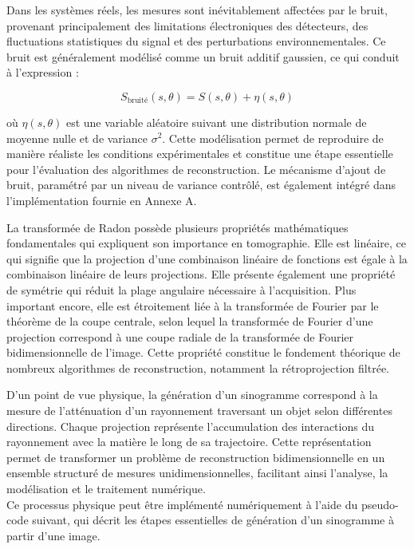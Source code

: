Dans les systèmes réels, les mesures sont inévitablement affectées par le bruit, provenant principalement des limitations électroniques des détecteurs, des fluctuations statistiques du signal et des perturbations environnementales. Ce bruit est généralement modélisé comme un bruit additif gaussien, ce qui conduit à l'expression :

$$S_{\text{bruité}}(s, \theta) = S(s, \theta) + \eta(s, \theta)$$

où $\eta(s,\theta)$ est une variable aléatoire suivant une distribution normale de moyenne nulle et de variance $\sigma^2$. Cette modélisation permet de reproduire de manière réaliste les conditions expérimentales et constitue une étape essentielle pour l'évaluation des algorithmes de reconstruction. Le mécanisme d'ajout de bruit, paramétré par un niveau de variance contrôlé, est également intégré dans l'implémentation fournie en Annexe A.

La transformée de Radon possède plusieurs propriétés mathématiques fondamentales qui expliquent son importance en tomographie. Elle est linéaire, ce qui signifie que la projection d'une combinaison linéaire de fonctions est égale à la combinaison linéaire de leurs projections. Elle présente également une propriété de symétrie qui réduit la plage angulaire nécessaire à l'acquisition. Plus important encore, elle est étroitement liée à la transformée de Fourier par le théorème de la coupe centrale, selon lequel la transformée de Fourier d'une projection correspond à une coupe radiale de la transformée de Fourier bidimensionnelle de l'image. Cette propriété constitue le fondement théorique de nombreux algorithmes de reconstruction, notamment la rétroprojection filtrée.

D'un point de vue physique, la génération d'un sinogramme correspond à la mesure de l'atténuation d'un rayonnement traversant un objet selon différentes directions. Chaque projection représente l'accumulation des interactions du rayonnement avec la matière le long de sa trajectoire. Cette représentation permet de transformer un problème de reconstruction bidimensionnelle en un ensemble structuré de mesures unidimensionnelles, facilitant ainsi l'analyse, la modélisation et le traitement numérique.\\
Ce processus physique peut être implémenté numériquement à l'aide du pseudo-code suivant, qui décrit les étapes essentielles de génération d'un sinogramme à partir d'une image.
